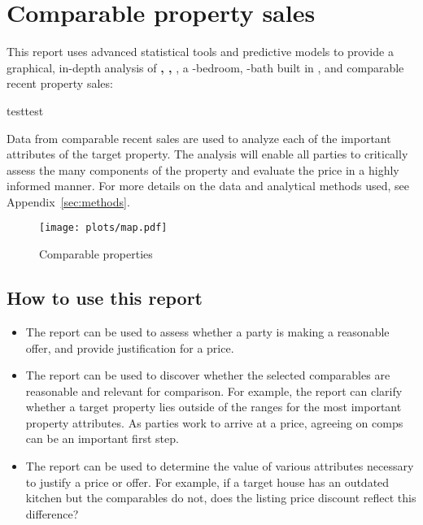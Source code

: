 \documentclass[
12pt, %
letterpaper, %
oneside, %
headinclude,footinclude, %
BCOR5mm, %
]{scrartcl}
\begin{document}


\section{Comparable property sales}
This report uses advanced statistical tools and predictive models to provide a graphical, in-depth analysis of 
\textbf{\PropertyName{}, \PropertyCity{}, \PropertyState{}}, 
a \NumberOfBedrooms{}-bedroom, \NumberOfBaths{}-bath 
\PropertyType{} built in \PropertyYearBuilt{}, and \NumberOfComps{} comparable recent property sales:


testtest


Data from comparable recent sales are used to analyze each of the important attributes of the target property. The analysis will enable all parties to critically assess the many components of the property and evaluate the price in a highly informed manner.
\newline For more details on the data and analytical methods used, see Appendix~\ref{sec:methods}.


\begin{figure}[h!]
\centering
\caption{Comparable properties} 
\label{fig:map}  
\texttt{[image: plots/map.pdf]} 
\end{figure}


\subsection{How to use this report}
\begin{itemize}
\item The report can be used to assess whether a party is making a reasonable offer, and provide justification for a price. 
\item The report can be used to discover whether the selected comparables are reasonable and relevant for comparison. For example, the report can clarify whether a target property lies outside of the ranges for the most important property attributes. As parties work to arrive at a price, agreeing on comps can be an important first step. 
\item The report can be used to determine the value of various attributes necessary to justify a price or offer. For example, if a target house has an outdated kitchen but the comparables do not, does the listing price discount reflect this difference? 
\end{itemize} 
\end{document}
